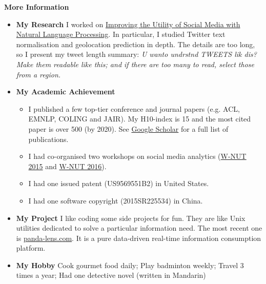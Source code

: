 \documentclass[letterpaper,12pt]{article}[leftmargin=*]
\def \entryspacing {-0pt}
\renewcommand{\section}[2]{\vspace{5pt}
  \colorbox{secondary}{\color{white}\raggedbottom\normalsize\textbf{{#1}{\hspace{7pt}#2}}}
}
\newcommand{\resumeEntryStart}{\begin{itemize}[leftmargin=2.5mm]}
\newcommand{\resumeEntryEnd}{\end{itemize}\vspace{\entryspacing}}
\newcommand{\resumeItemListStart}{\begin{itemize}[leftmargin=4.5mm]}
\newcommand{\resumeItemListEnd}{\end{itemize}}
\newcommand{\resumeItem}[1]{
  \item\small{
    {#1 \vspace{-2pt}}
  }
}
\newcommand{\resumeEntryS}[2]{
  \item[]\small{
    \textbf{\color{primary}#1 }{ #2 \vspace{-6pt}}
  }
}
\begin{document}
\section{\faGears}{More Information}

 \resumeEntryStart
  \resumeEntryS{My Research}{I worked on \href{https://minerva-access.unimelb.edu.au/bitstream/handle/11343/41029/thesis.pdf?sequence=1}{Improving the Utility of Social Media with Natural Language Processing}. In particular, I studied Twitter text normalisation and geolocation prediction in depth. The details are too long, so I present my tweet length summary: \textit{U wanto undrstnd TWEETS lik dis? Make them readable like this; and if there are too many to read, select those from a region.}}
\resumeEntryS{My Academic Achievement}{
    \resumeItemListStart
      \resumeItem {I published a few top-tier conference and journal papers (e.g. ACL, EMNLP, COLING and JAIR). My H10-index is 15 and the most cited paper is over 500 (by 2020). See \href{https://scholar.google.com/citations?hl=en&user=ZRr4vn8AAAAJ}{Google Scholar} for a full list of publications.}
      \resumeItem {I had co-organised two workshops on social media analytics (\href{https://noisy-text.github.io/2015/}{W-NUT 2015} and \href{https://noisy-text.github.io/2015/}{W-NUT 2016}).}
      \resumeItem {I had one issued patent (US9569551B2) in United States.}
      \resumeItem {I had one software copyright (2015SR225534) in China.}
    \resumeItemListEnd}

  \resumeEntryS{My Project} {I like coding some side projects for fun. They are like Unix utilities dedicated to solve a particular information need. The most recent one is \href{http://panda-lens.com/}{panda-lens.com}. It is a pure data-driven real-time information consumption platform.}
  \resumeEntryS{My Hobby} {Cook gourmet food daily; Play badminton weekly; Travel 3 times a year; Had one detective novel (written in Mandarin)}
 \resumeEntryEnd
\end{document}
